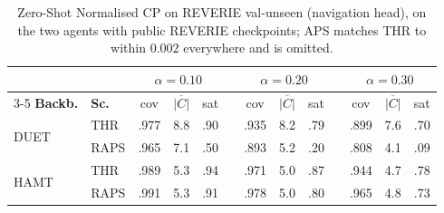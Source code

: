 \begin{table}[!ht]
\centering
\caption{Zero-Shot Normalised CP on REVERIE val-unseen (navigation head), on
the two agents with public REVERIE checkpoints; APS matches THR to within
$0.002$ everywhere and is omitted.}
\label{tab:reverie}
\setlength{\tabcolsep}{2.6pt}\scriptsize
\begin{tabular}{ll ccc c ccc c ccc}
\toprule
& & \multicolumn{3}{c}{$\alpha{=}0.10$} & &
    \multicolumn{3}{c}{$\alpha{=}0.20$} & &
    \multicolumn{3}{c}{$\alpha{=}0.30$} \\
\cmidrule{3-5}\cmidrule{7-9}\cmidrule{11-13}
\textbf{Backb.} & \textbf{Sc.}
 & cov & $\overline{|C|}$ & sat & & cov & $\overline{|C|}$ & sat
 & & cov & $\overline{|C|}$ & sat \\
\midrule
\multirow{2}{*}{DUET}
 & THR  & .977 & 8.8 & .90 & & .935 & 8.2 & .79 & & .899 & 7.6 & .70 \\
 & RAPS & .965 & 7.1 & .50 & & .893 & 5.2 & .20 & & .808 & 4.1 & .09 \\
\midrule
\multirow{2}{*}{HAMT}
 & THR  & .989 & 5.3 & .94 & & .971 & 5.0 & .87 & & .944 & 4.7 & .78 \\
 & RAPS & .991 & 5.3 & .91 & & .978 & 5.0 & .80 & & .965 & 4.8 & .73 \\
\bottomrule
\end{tabular}
\end{table}
